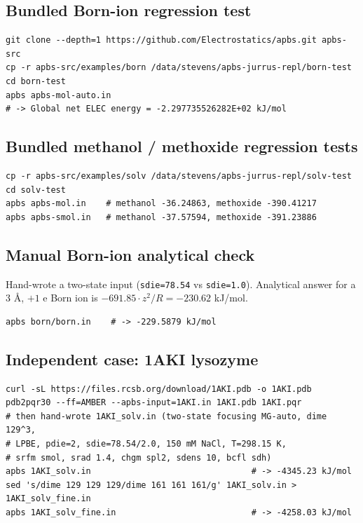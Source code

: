 \documentclass[11pt]{article}
\begin{document}
\subsection{Bundled Born-ion regression test}
\begin{lstlisting}
git clone --depth=1 https://github.com/Electrostatics/apbs.git apbs-src
cp -r apbs-src/examples/born /data/stevens/apbs-jurrus-repl/born-test
cd born-test
apbs apbs-mol-auto.in
# -> Global net ELEC energy = -2.297735526282E+02 kJ/mol
\end{lstlisting}

\subsection{Bundled methanol / methoxide regression tests}
\begin{lstlisting}
cp -r apbs-src/examples/solv /data/stevens/apbs-jurrus-repl/solv-test
cd solv-test
apbs apbs-mol.in    # methanol -36.24863, methoxide -390.41217
apbs apbs-smol.in   # methanol -37.57594, methoxide -391.23886
\end{lstlisting}

\subsection{Manual Born-ion analytical check}
Hand-wrote a two-state input (\texttt{sdie=78.54} vs \texttt{sdie=1.0}).
Analytical answer for a 3 \AA, $+1$ e Born ion is
$-691.85 \cdot z^2 / R = -230.62$ kJ/mol.
\begin{lstlisting}
apbs born/born.in    # -> -229.5879 kJ/mol
\end{lstlisting}

\subsection{Independent case: 1AKI lysozyme}
\begin{lstlisting}
curl -sL https://files.rcsb.org/download/1AKI.pdb -o 1AKI.pdb
pdb2pqr30 --ff=AMBER --apbs-input=1AKI.in 1AKI.pdb 1AKI.pqr
# then hand-wrote 1AKI_solv.in (two-state focusing MG-auto, dime 129^3,
# LPBE, pdie=2, sdie=78.54/2.0, 150 mM NaCl, T=298.15 K,
# srfm smol, srad 1.4, chgm spl2, sdens 10, bcfl sdh)
apbs 1AKI_solv.in                                # -> -4345.23 kJ/mol
sed 's/dime 129 129 129/dime 161 161 161/g' 1AKI_solv.in > 1AKI_solv_fine.in
apbs 1AKI_solv_fine.in                           # -> -4258.03 kJ/mol
\end{lstlisting}
\end{document}
